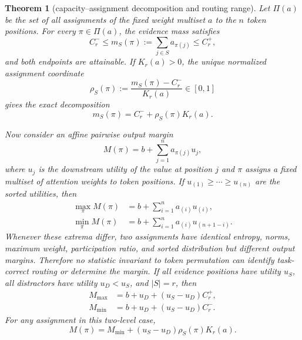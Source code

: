 \documentclass[letterpaper]{article} %
\newtheorem{theorem}[proposition]{Theorem}
\begin{document}
\begin{theorem}[capacity--assignment decomposition and routing range]
\label{thm:routing-range}
Let $\Pi(a)$ be the set of all assignments of the fixed weight multiset $a$ to the $n$ token positions.
For every $\pi\in\Pi(a)$, the evidence mass satisfies
\begin{equation}
C_r^-\le m_S(\pi):=\sum_{j\in S}a_{\pi(j)}\le C_r^+,
\label{eq:source-mass-range}
\end{equation}
and both endpoints are attainable. If $K_r(a)>0$, the unique normalized assignment coordinate
\begin{equation}
\rho_S(\pi):=\frac{m_S(\pi)-C_r^-}{K_r(a)}\in[0,1]
\label{eq:assignment-coordinate}
\end{equation}
gives the exact decomposition
\begin{equation}
m_S(\pi)=C_r^-+\rho_S(\pi)K_r(a).
\label{eq:capacity-assignment}
\end{equation}

Now consider an affine pairwise output margin
\begin{equation}
M(\pi)=b+\sum_{j=1}^{n}a_{\pi(j)}u_j,
\label{eq:affine-margin}
\end{equation}
where $u_j$ is the downstream utility of the value at position $j$ and $\pi$ assigns a fixed multiset of
attention weights to token positions.
If $u_{(1)}\ge\cdots\ge u_{(n)}$ are the sorted utilities, then
\begin{align}
\max_\pi M(\pi)&=b+\sum_{i=1}^{n}a_{(i)}u_{(i)},\\
\min_\pi M(\pi)&=b+\sum_{i=1}^{n}a_{(i)}u_{(n+1-i)}.
\label{eq:routing-range}
\end{align}
Whenever these extrema differ, two assignments have identical entropy, norms, maximum weight,
participation ratio, and sorted distribution but different output margins. Therefore no statistic invariant
to token permutation can identify task-correct routing or determine the margin.
If all evidence positions have utility $u_S$, all distractors have utility $u_D<u_S$, and $|S|=r$, then
\begin{align}
M_{\max}&=b+u_D+(u_S-u_D)C_r^+,\\
M_{\min}&=b+u_D+(u_S-u_D)C_r^-.
\label{eq:binary-routing-range}
\end{align}
For any assignment in this two-level case,
\begin{equation}
M(\pi)=M_{\min}+(u_S-u_D)\rho_S(\pi)K_r(a).
\label{eq:binary-capacity-assignment}
\end{equation}
\end{theorem}
\end{document}
